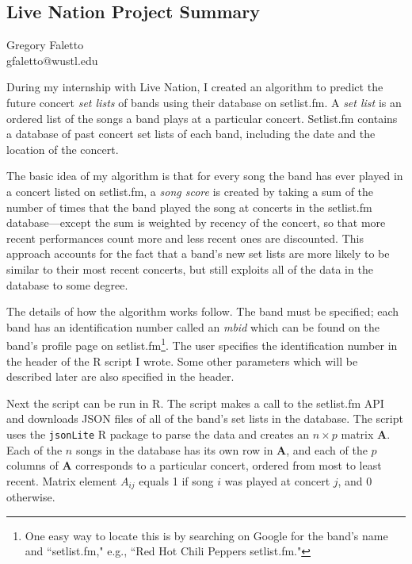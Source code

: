 \documentclass{article}
\begin{document}


\begin{centering}
\section*{Live Nation Project Summary}
\end{centering}

\begin{center}
Gregory Faletto \\
gfaletto@wustl.edu
\end{center}

During my internship with Live Nation, I created an algorithm to predict the future concert \textit{set lists} of bands using their database on setlist.fm. A \textit{set list} is an ordered list of the songs a band plays at a particular concert. Setlist.fm contains a database of past concert set lists of each band, including the date and the location of the concert.

The basic idea of my algorithm is that for every song the band has ever played in a concert listed on setlist.fm, a \textit{song score} is created by taking a sum of the number of times that the band played the song at concerts in the setlist.fm database---except the sum is weighted by recency of the concert, so that more recent performances count more and less recent ones are discounted. This approach accounts for the fact that a band's new set lists are more likely to be similar to their most recent concerts, but still exploits all of the data in the database to some degree.

The details of how the algorithm works follow. The band must be specified; each band has an identification number called an \textit{mbid} which can be found on the band's profile page on setlist.fm\footnote{One easy way to locate this is by searching on Google for the band's name and ``setlist.fm," e.g., ``Red Hot Chili Peppers setlist.fm."}. The user specifies the identification number in the header of the R script I wrote. Some other parameters which will be described later are also specified in the header.

Next the script can be run in R. The script makes a call to the setlist.fm API and downloads JSON files of all of the band's set lists in the database. The script uses the \texttt{jsonLite} R package to parse the data and creates an \(n \times p\) matrix \(\boldsymbol{A}\). Each of the \(n\) songs in the database has its own row in \(\boldsymbol{A}\), and each of the \(p\) columns of \(\boldsymbol{A}\) corresponds to a particular concert, ordered from most to least recent. Matrix element \(A_{ij}\) equals 1 if song \(i\) was played at concert \(j\), and 0 otherwise.
\end{document}
